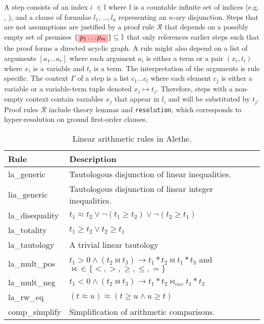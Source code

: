 A step %
consists of an index \colorbox{indexClr!30}{$i$} $\in \mathbb{I}$ where $\mathbb{I}$ is a countable infinite set of indices (e.g. , ), and a clause of formulae \colorbox{green!30}{$l_1, \dots, l_n$} representing an $n$-ary disjunction. Steps that are not assumptions are justified by a proof rule \colorbox{purple!30}{$\mathcal{R}$} that depends on a possibly empty set of premises $\{\colorbox{red!30}{$p_1 \dots  p_m$}\} \subseteq \mathbb{I}$ that only references earlier steps such that the proof forms
a directed acyclic graph. A rule might also depend on a list of arguments \colorbox{orange!30}{$[a_1 \dots a_r]$} where each argument $a_i$ is either a term or a pair $(x_i, t_i)$ where $x_i$ is a variable and $t_i$ is a term. The interpretation of the arguments is rule specific. The context \colorbox{blue!30}{$\Gamma$} of a step is a list $c_1 \dots c_l $ where each element $c_j$ is either a variable or a variable-term tuple denoted $x_j \mapsto t_j$. Therefore, steps with a non-empty context contain variables $x_j$ that appear in \colorbox{green!30}{$l_i$} and will be substituted by $t_j$. Proof rules \colorbox{purple!30}{$\mathcal{R}$} include theory lemmas and \texttt{resolution}, which corresponds to hyper-resolution on ground first-order clauses. 


\begin{table}[]
    \centering
    \begin{tabular}{ll}
    Rule & Description \\ \hline
    la\_generic & Tautologous disjunction of linear inequalities. \\
    lia\_generic & Tautologous disjunction of linear integer inequalities. \\
    la\_disequality & $t_1 \approx t_2 \lor \neg (t_1 \geq t_2) \lor \neg (t_2 \geq t_1)$ \\
    la\_totality & $t_1 \geq t_2 \lor t_2 \geq t_1$ \\
    la\_tautology & A trivial linear tautology \\
    la\_mult\_pos & $t_1 > 0 \land (t_2 \bowtie t_3) \rightarrow t_1 * t_2 \bowtie t_1 * t_3$ and $\bowtie \in \{<, >, \geq, \leq, =\}$ \\
    la\_mult\_neg & $t_1 < 0 \land (t_2 \bowtie t_3) \rightarrow t_1 * t_2 \bowtie_{inv} t_1 * t_3$ \\
    la\_rw\_eq & $(t \approx u) \approx (t \geq u \land u \geq t)$ \\
    comp\_simplify & Simplification of arithmetic comparisons. \\
    \end{tabular}
    \caption{Linear arithmetic rules in Alethe.}
    \label{table:linear-arith-rules}
\end{table}

